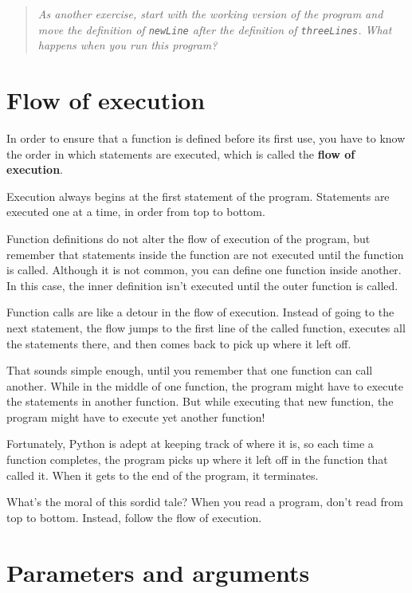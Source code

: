 \begin{quote}
{\em As another exercise, start with the working version of the program
and move the definition of {\tt newLine} after the definition of
{\tt threeLines}.  What happens when you run this program?}
\end{quote}

\section{Flow of execution}

In order to ensure that a function is defined before its first use,
you have to know the order in which statements are executed, which is
called the {\bf flow of execution}.

Execution always begins at the first statement of the program.  Statements are
executed one at a time, in order from top to bottom.

Function definitions do not alter the flow of execution of the program, but
remember that statements inside the function are not executed until the
function is called.  Although it is not common, you can define one function
inside another.  In this case, the inner definition isn't executed until the
outer function is called.

Function calls are like a detour in the flow of execution. Instead of going to
the next statement, the flow jumps to the first line of the called function,
executes all the statements there, and then comes back to pick up where it left
off.

That sounds simple enough, until you remember that one function can call
another.  While in the middle of one function, the program might have to
execute the statements in another function. But while executing that
new function, the program might have to execute yet another function!

Fortunately, Python is adept at keeping track of where it is, so each time a
function completes, the program picks up where it left off in the function that
called it.  When it gets to the end of the program, it terminates.

What's the moral of this sordid tale?  When you read a program, don't read from
top to bottom.  Instead, follow the flow of execution.


\section{Parameters and arguments}
\label{parameters}

